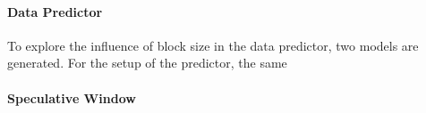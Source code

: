 \paragraph{Data Predictor}
To explore the influence of block size in the data predictor, two models are generated.
For the setup of the predictor, the same 
\paragraph{Speculative Window}
